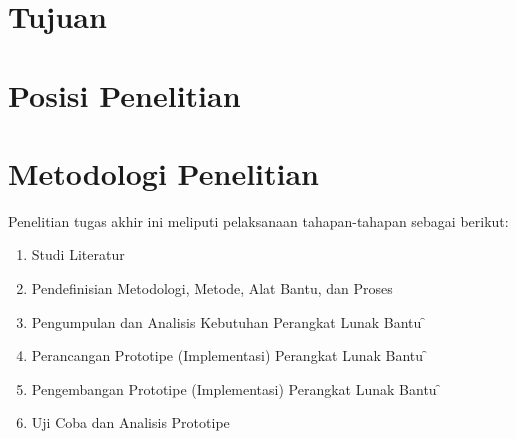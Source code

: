\section{Tujuan}


\section{Posisi Penelitian}


\section{Metodologi Penelitian}
Penelitian tugas akhir ini meliputi pelaksanaan tahapan-tahapan sebagai berikut: 
\begin{enumerate}
\item Studi Literatur

\item Pendefinisian Metodologi, Metode, Alat Bantu, dan Proses

\item Pengumpulan dan Analisis Kebutuhan Perangkat Lunak Bantu \f{\Reqm}

\item Perancangan Prototipe (Implementasi) Perangkat Lunak Bantu \f{\Reqm} 

\item Pengembangan Prototipe (Implementasi) Perangkat Lunak Bantu \f{\Reqm}

\item Uji Coba dan Analisis Prototipe
 
\end{enumerate}

